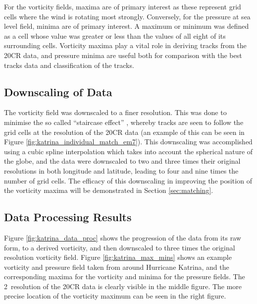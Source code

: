 \documentclass[pdftex,12pt,a4paper]{report}
\begin{document}
For the vorticity fields, maxima are of primary interest as these represent grid cells where the
wind is rotating most strongly. Conversely, for the pressure at sea level field, minima are of
primary interest. A maximum or minimum was defined as a cell whose value was greater or less than
the values of all eight of its surrounding cells. Vorticity maxima play a vital role in deriving
tracks from the 20CR data, and pressure minima are useful both for comparison with the best tracks
data and classification of the tracks.

\subsection{Downscaling of Data}

The vorticity field was downscaled to a finer resolution. This was done to minimise the so called
``staircase effect'' \parencite{hodges1994general}, whereby tracks are seen to follow the grid cells
at the resolution of the 20CR data (an example of this can be seen in Figure
\ref{fig:katrina_individual_match_em7}).  This downscaling was accomplished using a cubic spline
interpolation which takes into account the spherical nature of the globe, and the data were
downscaled to two and three times their original resolutions in both longitude and latitude, leading
to four and nine times the number of grid cells. The efficacy of this downscaling in improving the
position of the vorticity maxima will be demonstrated in Section \ref{sec:matching}.


\subsection{Data Processing Results}

Figure \ref{fig:katrina_data_proc} shows the progression of the data from its raw form, to a derived
vorticity, and then downscaled to three times the original resolution vorticity field. Figure
\ref{fig:katrina_max_mins} shows an example vorticity and pressure field taken from around Hurricane
Katrina, and the corresponding maxima for the vorticity and minima for the pressure fields.
The 2\textdegree\ resolution of the 20CR data is clearly visible in the middle figure. The more
precise location of the vorticity maximum can be seen in the right figure.
\end{document}
